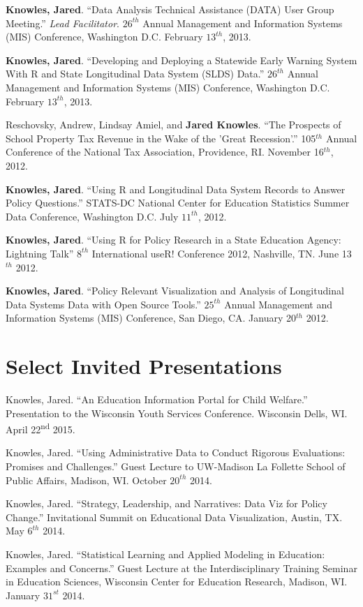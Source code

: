 \documentclass[margin,line]{res}
\begin{document}
\begin{resume}
\textbf{Knowles, Jared}. ``Data Analysis Technical Assistance (DATA) User Group Meeting.'' \emph{Lead Facilitator}. $26^{th}$ Annual Management and Information Systems (MIS) Conference, Washington D.C. February $13^{th}$, 2013.

\textbf{Knowles, Jared}. ``Developing and Deploying a Statewide Early Warning System With R and State Longitudinal Data System (SLDS) Data.'' $26^{th}$ Annual Management and Information Systems (MIS) Conference, Washington D.C. February $13^{th}$, 2013.

Reschovsky, Andrew, Lindsay Amiel, and \textbf{Jared Knowles}. ``The Prospects of School Property Tax Revenue in the Wake of the 'Great Recession'.'' 105$^{th}$ Annual Conference of the National Tax Association, Providence, RI. November 16$^{th}$, 2012. 

\textbf{Knowles, Jared}. ``Using R and Longitudinal Data System Records to Answer Policy Questions.'' STATS-DC National Center for Education Statistics Summer Data Conference, Washington D.C. July $11^{th}$, 2012.

\textbf{Knowles, Jared}. ``Using R for Policy Research in a State Education Agency: Lightning Talk'' $8^{th}$ International useR! Conference 2012, Nashville, TN. June 13$^{th}$ 2012.

\textbf{Knowles, Jared}. ``Policy Relevant Visualization and Analysis of Longitudinal Data Systems Data with Open Source Tools.'' $25^{th}$ Annual Management and Information Systems (MIS) Conference, San Diego, CA. January 20$^{th}$ 2012.

\section{\sc Select Invited Presentations}

Knowles, Jared. ``An Education Information Portal for Child Welfare.'' Presentation to the Wisconsin Youth Services Conference. Wisconsin Dells, WI. April 22\textsuperscript{nd} 2015.

Knowles, Jared. ``Using Administrative Data to Conduct Rigorous Evaluations: Promises and Challenges.'' Guest Lecture to UW-Madison La Follette School of Public Affairs, Madison, WI. October $20^{th}$ 2014.

Knowles, Jared. ``Strategy, Leadership, and Narratives: Data Viz for Policy Change.'' Invitational Summit on Educational Data Visualization, Austin, TX. May $6^{th}$ 2014. 

Knowles, Jared. ``Statistical Learning and Applied Modeling in Education: Examples 
and Concerns.'' Guest Lecture at the Interdisciplinary Training Seminar in Education Sciences, Wisconsin Center for Education Research, Madison, WI. January $31^{st}$ 2014.


\end{resume}
\end{document}
